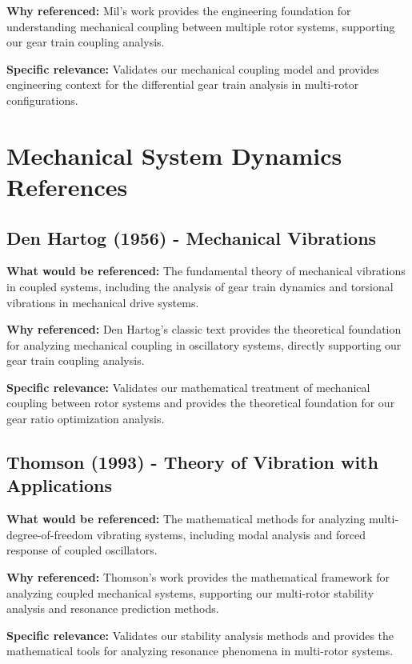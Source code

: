 \documentclass{article}
\begin{document}
\textbf{Why referenced:} Mil's work provides the engineering foundation for understanding mechanical coupling between multiple rotor systems, supporting our gear train coupling analysis.

\textbf{Specific relevance:} Validates our mechanical coupling model and provides engineering context for the differential gear train analysis in multi-rotor configurations.

\section{Mechanical System Dynamics References}

\subsection{Den Hartog (1956) - Mechanical Vibrations}

\textbf{What would be referenced:} The fundamental theory of mechanical vibrations in coupled systems, including the analysis of gear train dynamics and torsional vibrations in mechanical drive systems.

\textbf{Why referenced:} Den Hartog's classic text provides the theoretical foundation for analyzing mechanical coupling in oscillatory systems, directly supporting our gear train coupling analysis.

\textbf{Specific relevance:} Validates our mathematical treatment of mechanical coupling between rotor systems and provides the theoretical foundation for our gear ratio optimization analysis.

\subsection{Thomson (1993) - Theory of Vibration with Applications}

\textbf{What would be referenced:} The mathematical methods for analyzing multi-degree-of-freedom vibrating systems, including modal analysis and forced response of coupled oscillators.

\textbf{Why referenced:} Thomson's work provides the mathematical framework for analyzing coupled mechanical systems, supporting our multi-rotor stability analysis and resonance prediction methods.

\textbf{Specific relevance:} Validates our stability analysis methods and provides the mathematical tools for analyzing resonance phenomena in multi-rotor systems.
\end{document}
